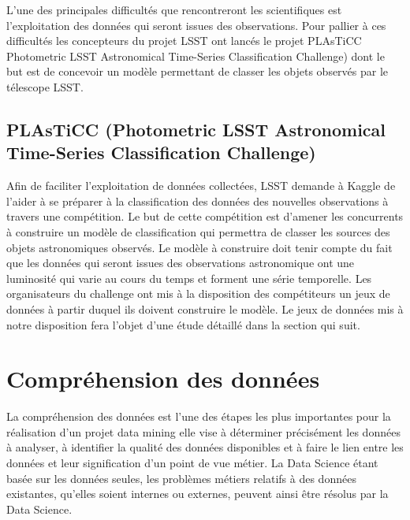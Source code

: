L’une des principales difficultés que rencontreront les scientifiques est l’exploitation des données qui seront issues des observations.
Pour pallier à ces difficultés les concepteurs du projet LSST ont lancés le projet PLAsTiCC  Photometric LSST Astronomical Time-Series Classification Challenge) dont le but est de concevoir un modèle permettant de classer les objets observés par le télescope LSST.

\subsection{PLAsTiCC  (Photometric LSST Astronomical Time-Series Classification Challenge)}
Afin de faciliter l’exploitation de données collectées, LSST demande à Kaggle de l’aider à se préparer à la classification des données des nouvelles observations à travers une compétition. 
Le but de cette compétition est d’amener les concurrents  à construire un modèle de  classification qui permettra de classer  les sources  des objets astronomiques observés. 
Le modèle à construire doit tenir compte du fait que les données qui seront issues des observations astronomique ont une luminosité qui varie au cours du temps et forment une série temporelle.
Les organisateurs du challenge ont mis à la disposition des compétiteurs un jeux de données à partir duquel ils doivent construire le modèle.
Le jeux de données mis à notre disposition fera l’objet d’une étude détaillé dans la section qui suit.



\section{Compréhension des données}
La compréhension des données est l’une des étapes les plus importantes pour la réalisation d’un projet data mining elle vise à déterminer précisément les données à analyser, à identifier la qualité des données disponibles et à faire le lien entre les données
et leur signification d’un point de vue métier. La Data Science étant basée sur les données seules, les problèmes métiers relatifs à des données existantes, qu’elles soient internes ou externes, peuvent ainsi être résolus par la Data Science.

